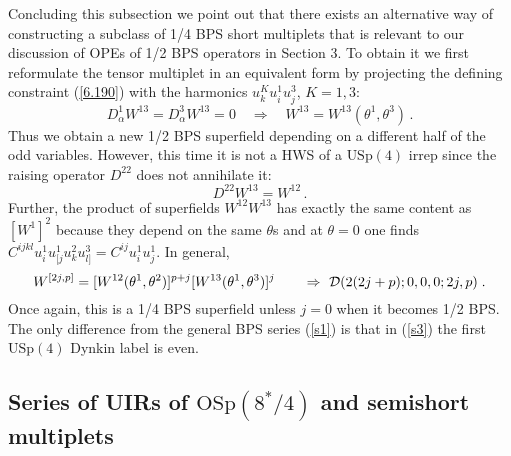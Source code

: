 \documentclass[a4paper,11pt]{article}
\begin{document}
Concluding this subsection we point out that there exists an alternative way of
constructing a subclass of 1/4 BPS short multiplets that is relevant to our
discussion of OPEs of 1/2 BPS operators in Section 3. To obtain it we first
reformulate the tensor multiplet in an equivalent form by projecting the
defining constraint (\ref{6.190}) with the harmonics $u^K_k u^1_{i}u^3_j$,
$K=1,3$:
\begin{equation}\label{6.2700}
D^1_\alpha W^{13} = D^3_\alpha W^{13}= 0\quad \Rightarrow \quad  W^{13} =
W^{13}(\theta^1,\theta^3)\,.
\end{equation}
Thus we obtain a new 1/2 BPS superfield depending on a different half of the
odd variables. However, this time it is not a HWS of a $\mbox{USp}(4)$ irrep
since the raising operator $D^{22}$ does not annihilate it:
\begin{equation}\label{s2}
  D^{22} W^{13}= W^{12} \,.
\end{equation}
Further, the product of superfields $W^{12}W^{13}$ has exactly the same content
as $[W^1]^2$ because they depend on the same $\theta$s and at $\theta=0$ one
finds $C^{ijkl}u^1_iu^1_{[j}u^2_ku^3_{l]} = C^{ij}u^1_iu^1_j$. In general,
\begin{equation}\label{s3}
  W^{[2j,p]} = [W^{12}(\theta^1,\theta^2)]^{p+j}
   [W^{13}(\theta^1,\theta^3)]^{j}  \qquad \Rightarrow \ {\cal
D}(2(2j+p);0,0,0;2j,p)\;.
\end{equation}
Once again, this is a 1/4 BPS superfield unless $j=0$ when it becomes 1/2 BPS.
The only difference from the general BPS series (\ref{s1}) is that in
(\ref{s3}) the first $\mbox{USp}(4)$ Dynkin label is even.

\subsection{Series of UIRs of ${\mbox{OSp}}(8^*/4)$ and semishort multiplets}
\end{document}
